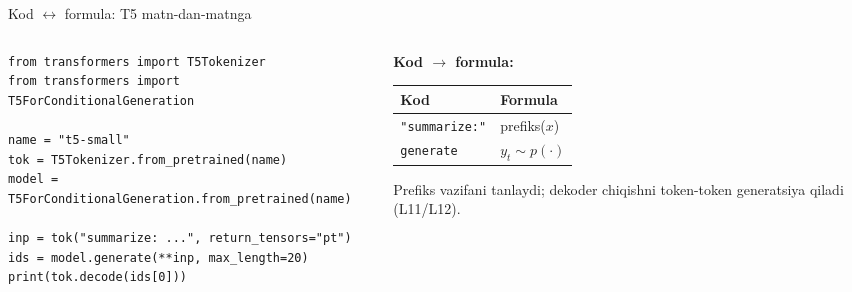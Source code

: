 \documentclass[aspectratio=169,11pt]{beamer}
\begin{document}
\begin{frame}[fragile]{Kod $\leftrightarrow$ formula: T5 matn-dan-matnga}
  \begin{columns}[T]
    \begin{column}{0.58\textwidth}
\begin{lstlisting}
from transformers import T5Tokenizer
from transformers import T5ForConditionalGeneration

name = "t5-small"
tok = T5Tokenizer.from_pretrained(name)
model = T5ForConditionalGeneration.from_pretrained(name)

inp = tok("summarize: ...", return_tensors="pt")
ids = model.generate(**inp, max_length=20)
print(tok.decode(ids[0]))
\end{lstlisting}
    \end{column}
    \begin{column}{0.38\textwidth}
      \textbf{Kod $\to$ formula:}\\[3pt]
      \footnotesize
      \begin{tabular}{p{1.9cm}p{1.9cm}}
        \toprule
        Kod & Formula \\
        \midrule
        \texttt{"summarize:"} & prefiks($x$) \\
        \texttt{generate} & $y_t \sim p(\cdot)$ \\
        \bottomrule
      \end{tabular}
      \vspace{4pt}
      \begin{tcolorbox}[okbox,top=2pt,bottom=2pt]
        \footnotesize
        Prefiks vazifani tanlaydi; dekoder chiqishni token-token generatsiya
        qiladi (L11/L12).
      \end{tcolorbox}
    \end{column}
  \end{columns}
\end{frame}
\end{document}
